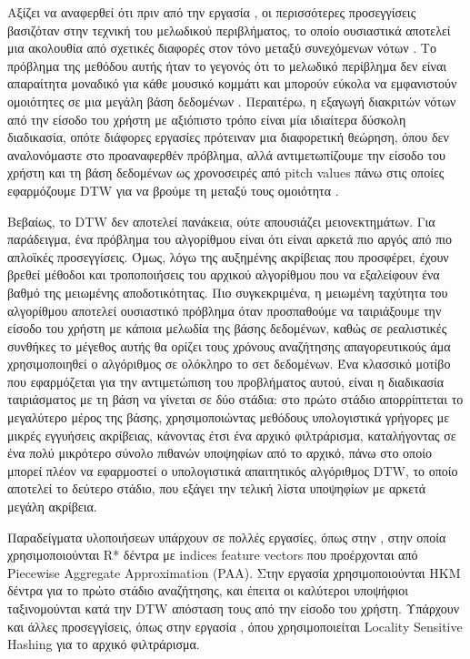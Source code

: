 Αξίζει να αναφερθεί ότι πριν από την εργασία \cite{Zhu:2003:WIE:872757.872780}, οι περισσότερες προσεγγίσεις βασιζόταν στην τεχνική του μελωδικού περιβλήματος, το οποίο ουσιαστικά αποτελεί μια ακολουθία από σχετικές διαφορές στον τόνο μεταξύ συνεχόμενων νότων \cite{Ghias:1995:QHM:217279.215273}.
Το πρόβλημα της μεθόδου αυτής ήταν το γεγονός ότι το μελωδικό περίβλημα δεν είναι απαραίτητα μοναδικό για κάθε μουσικό κομμάτι και μπορούν εύκολα να εμφανιστούν ομοιότητες σε μια μεγάλη βάση δεδομένων \cite{Uitdenbogerd:1998:MMM:290747.290776}.
Περαιτέρω, η εξαγωγή διακριτών νότων από την είσοδο του χρήστη με αξιόπιστο τρόπο είναι μία ιδιαίτερα δύσκολη διαδικασία, οπότε διάφορες εργασίες πρότειναν μια διαφορετική θεώρηση, όπου δεν αναλονόμαστε στο προαναφερθέν πρόβλημα, αλλά αντιμετωπίζουμε την είσοδο του χρήστη και τη βάση δεδομένων ως χρονοσειρές από pitch values πάνω στις οποίες εφαρμόζουμε DTW για να βρούμε τη μεταξύ τους ομοιότητα \cite{Jang:2001:HFM:500141.500201,mazzoni2001melody}.

Βεβαίως, το DTW δεν αποτελεί πανάκεια, ούτε απουσιάζει μειονεκτημάτων. Για παράδειγμα, ένα πρόβλημα του αλγορίθμου είναι ότι είναι αρκετά πιο αργός από πιο απλοϊκές προσεγγίσεις. 
Όμως, λόγω της αυξημένης ακρίβειας που προσφέρει, έχουν βρεθεί μέθοδοι και τροποποιήσεις του αρχικού αλγορίθμου που να εξαλείφουν ένα βαθμό της μειωμένης αποδοτικότητας.
Πιο συγκεκριμένα, η μειωμένη ταχύτητα του αλγορίθμου αποτελεί ουσιαστικό πρόβλημα όταν προσπαθούμε να ταιριάξουμε την είσοδο του χρήστη με κάποια μελωδία της βάσης δεδομένων, καθώς σε ρεαλιστικές συνθήκες το μέγεθος αυτής θα ορίζει τους χρόνους αναζήτησης απαγορευτικούς άμα χρησιμοποιηθεί ο αλγόριθμος σε ολόκληρο το σετ δεδομένων.
Ένα κλασσικό μοτίβο που εφαρμόζεται για την αντιμετώπιση του προβλήματος αυτού, είναι η διαδικασία ταιριάσματος με τη βάση να γίνεται σε δύο στάδια: στο πρώτο στάδιο απορρίπτεται το μεγαλύτερο μέρος της βάσης, χρησιμοποιώντας μεθόδους υπολογιστικά γρήγορες με μικρές εγγυήσεις ακρίβειας, κάνοντας έτσι ένα αρχικό φιλτράρισμα, καταλήγοντας σε ένα πολύ μικρότερο σύνολο πιθανών υποψηφίων από το αρχικό, πάνω στο οποίο μπορεί πλέον να εφαρμοστεί ο υπολογιστικά απαιτητικός αλγόριθμος DTW, το οποίο αποτελεί το δεύτερο στάδιο, που εξάγει την τελική λίστα υποψηφίων με αρκετά μεγάλη ακρίβεια.

Παραδείγματα υλοποιήσεων υπάρχουν σε πολλές εργασίες, όπως στην \cite{Zhu:2003:WIE:872757.872780}, στην οποία χρησιμοποιούνται R* δέντρα με indices feature vectors που προέρχονται από Piecewise Aggregate Approximation (PAA). Στην εργασία \cite{hou2014mirex2014} χρησιμοποιούνται HKM δέντρα για το πρώτο στάδιο αναζήτησης, και έπειτα οι καλύτεροι υποψήφιοι ταξινομούνται κατά την DTW απόσταση τους από την είσοδο του χρήστη. Υπάρχουν και άλλες προσεγγίσεις, όπως στην εργασία \cite{ryynanen2008query}, όπου χρησιμοποιείται Locality Sensitive Hashing για το αρχικό φιλτράρισμα.

